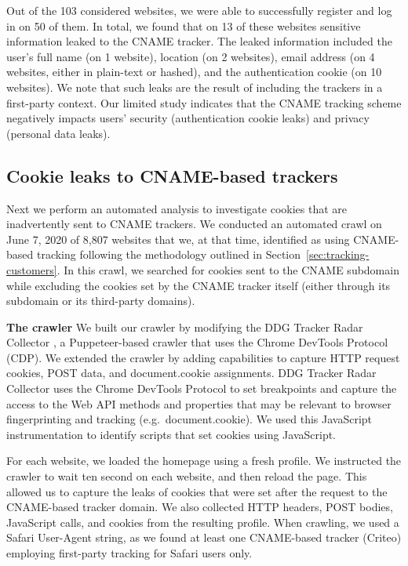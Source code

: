 Out of the 103 considered websites, we were able to successfully register and log in on 50 of them.
In total, we found that on 13 of these websites sensitive information leaked to the CNAME tracker.
The leaked information included the user's full name (on 1 website), location (on 2 websites), email address (on 4 websites, either in plain-text or hashed), and the authentication cookie (on 10 websites). 
We note that such leaks are the result of including the trackers in a first-party context.
Our limited study indicates that the CNAME tracking scheme negatively impacts users' security (authentication cookie leaks) and privacy (personal data leaks).


\subsection{Cookie leaks to CNAME-based trackers}
\label{sec:cookie-leak-automated-experiment}

Next we perform an automated analysis to investigate cookies that are inadvertently sent to CNAME trackers.
We conducted an automated crawl on June 7, 2020 of 8,807 websites that we, at that time, identified as using CNAME-based tracking following the methodology outlined in Section~\ref{sec:tracking-customers}.
In this crawl, we searched for cookies sent to the CNAME subdomain while excluding the cookies set by the CNAME tracker itself (either through its subdomain or its third-party domains).

\textbf{The crawler}
We built our crawler by modifying the DDG Tracker Radar Collector \cite{ddg}, a Puppeteer-based crawler that uses the Chrome DevTools Protocol (CDP).
We extended the crawler by adding capabilities to capture HTTP request cookies, POST data, and document.cookie assignments.
DDG Tracker Radar Collector uses the Chrome DevTools Protocol to set breakpoints and capture the access to the Web API methods and properties that may be relevant to browser fingerprinting and tracking (e.g.\ document.cookie).
We used this JavaScript instrumentation to identify scripts that set cookies using JavaScript.

For each website, we loaded the homepage using a fresh profile.
We instructed the crawler to wait ten second on each website, and then reload the page.
This allowed us to capture the leaks of cookies that were set after the request to the CNAME-based tracker domain.
We also collected HTTP headers, POST bodies, JavaScript calls, and cookies from the resulting profile.
When crawling, we used a Safari User-Agent string, as we found at least one CNAME-based tracker (Criteo) employing first-party tracking for Safari users only.

